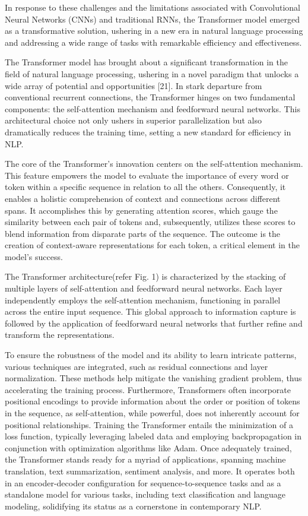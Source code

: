 \documentclass[conference]{IEEEtran}
\begin{document}
In response to these challenges and the limitations associated with Convolutional Neural Networks (CNNs) and traditional RNNs, the Transformer model emerged as a transformative solution, ushering in a new era in natural language processing and addressing a wide range of tasks with remarkable efficiency and effectiveness.

The Transformer model has brought about a significant transformation in the field of natural language processing, ushering in a novel paradigm that unlocks a wide array of potential and opportunities [21]. In stark departure from conventional recurrent connections, the Transformer hinges on two fundamental components: the self-attention mechanism and feedforward neural networks. This architectural choice not only ushers in superior parallelization but also dramatically reduces the training time, setting a new standard for efficiency in NLP.


The core of the Transformer's innovation centers on the self-attention mechanism. This feature empowers the model to evaluate the importance of every word or token within a specific sequence in relation to all the others. Consequently, it enables a holistic comprehension of context and connections across different spans. It accomplishes this by generating attention scores, which gauge the similarity between each pair of tokens and, subsequently, utilizes these scores to blend information from disparate parts of the sequence. The outcome is the creation of context-aware representations for each token, a critical element in the model's success.


The Transformer architecture(refer Fig. 1) is characterized by the stacking of multiple layers of self-attention and feedforward neural networks. Each layer independently employs the self-attention mechanism, functioning in parallel across the entire input sequence. This global approach to information capture is followed by the application of feedforward neural networks that further refine and transform the representations.


To ensure the robustness of the model and its ability to learn intricate patterns, various techniques are integrated, such as residual connections and layer normalization. These methods help mitigate the vanishing gradient problem, thus accelerating the training process. Furthermore, Transformers often incorporate positional encodings to provide information about the order or position of tokens in the sequence, as self-attention, while powerful, does not inherently account for positional relationships.
Training the Transformer entails the minimization of a loss function, typically leveraging labeled data and employing backpropagation in conjunction with optimization algorithms like Adam. Once adequately trained, the Transformer stands ready for a myriad of applications, spanning machine translation, text summarization, sentiment analysis, and more. It operates both in an encoder-decoder configuration for sequence-to-sequence tasks and as a standalone model for various tasks, including text classification and language modeling, solidifying its status as a cornerstone in contemporary NLP.
\end{document}

